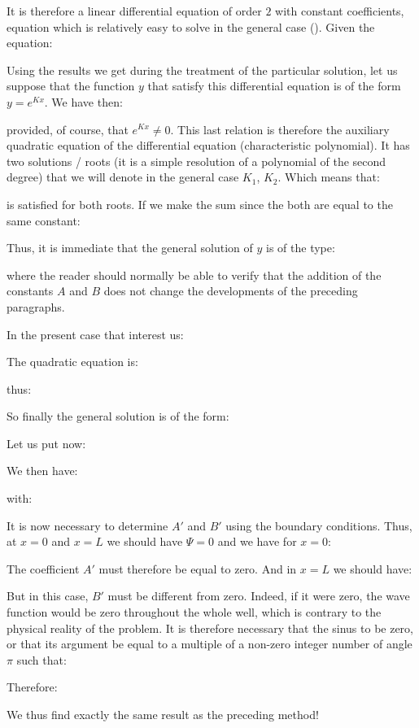 	It is therefore a linear differential equation of order $2$ with constant coefficients, equation which is relatively easy to solve in the general case (). Given the equation:
	
	Using the results we get during the treatment of the particular solution, let us suppose that the function $y$ that satisfy this differential equation is of the form $y=e^{Kx}$. We have then:
	
	provided, of course, that $e^{Kx}\neq 0$. This last relation is therefore the auxiliary quadratic equation of the differential equation (characteristic polynomial). It has two solutions / roots (it is a simple resolution of a polynomial of the second degree) that we will denote in the general case $K_1$, $K_2$. Which means that:
	
	is satisfied for both roots. If we make the sum since the both are equal to the same constant:
	
	Thus, it is immediate that the general solution of $y$ is of the type:
	
	where the reader should normally be able to verify that the addition of the constants $A$ and $B$ does not change the developments of the preceding paragraphs.

	In the present case that interest us:
	
	The quadratic equation is:
	
	thus:
	
	So finally the general solution is of the form:
	
	Let us put now:
	
	We then have:
	
	with:
	
	It is now necessary to determine $A'$ and $B'$ using the boundary conditions. Thus, at $x = 0$ and $x = L$ we should have $\Psi=0$ and we have for $x = 0$:
	
	The coefficient $A'$ must therefore be equal to zero. And in $x = L$ we should have:
	
	But in this case, $B'$ must be different from zero. Indeed, if it were zero, the wave function would be zero throughout the whole well, which is contrary to the physical reality of the problem. It is therefore necessary that the sinus to be zero, or that its argument be equal to a multiple of a non-zero integer number of angle $\pi$ such that:
	
	Therefore:
	
	We thus find exactly the same result as the preceding method!

